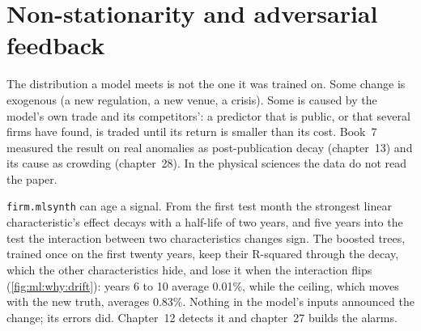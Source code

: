 \begin{omfigure}

\label{fig:ml:why:months}
\end{omfigure}

\section{Non-stationarity and adversarial feedback}

The distribution a model meets is not the one it was trained on. Some change is exogenous (a new regulation, a new
venue, a crisis). Some is caused by the model's own trade and its competitors': a predictor that is public, or that
several firms have found, is traded until its return is smaller than its cost. Book~7 measured the result on real
anomalies as post-publication decay (chapter~13) and its cause as crowding (chapter~28). In the physical sciences the
data do not read the paper.

\texttt{firm.mlsynth} can age a signal. From the first test month the strongest linear characteristic's effect decays
with a half-life of two years, and five years into the test the interaction between two characteristics changes sign.
The boosted trees, trained once on the first twenty years, keep their R-squared through the decay, which the other
characteristics hide, and lose it when the interaction flips (\cref{fig:ml:why:drift}): years 6 to 10 average
0.01\%, while the ceiling, which moves with the new truth, averages 0.83\%. Nothing in the model's inputs announced
the change; its errors did. Chapter~12 detects it and
chapter~27 builds the alarms.

